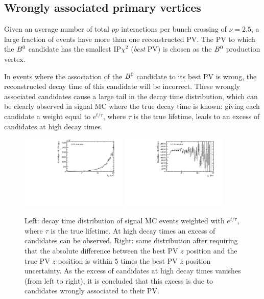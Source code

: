 \subsection{Wrongly associated primary vertices}
\label{sec:WrongPVs}

Given an average number of total $pp$ interactions per bunch crossing of
$\nu=\num{2.5}$, a large fraction of events have more than one reconstructed PV.
The PV to which the $B^0$ candidate has the smallest IP$\chi^2$ (\emph{best} PV) is chosen as the $B^0$ production vertex.

In events where the association of the $B^0$ candidate to its best PV
is wrong, the reconstructed decay time of this candidate will be incorrect. These wrongly
associated candidates cause a large tail in
the decay time distribution, which can be clearly observed in signal MC where the
true decay time is known: giving each candidate a weight equal to $e^{t/\tau}$, where $\tau$ is the
true lifetime, leads to an excess of candidates at high decay times.
%
\begin{figure}[t]
	\begin{center}
		\includegraphics[width=0.45\textwidth]{02Selection/figs/WrongPVs-weightedBad.pdf}
		\includegraphics[width=0.45\textwidth]{02Selection/figs/WrongPVs-weightedGoodMC.pdf}
	\end{center}
        \vspace{-2mm}
	\caption{Left: decay time distribution of signal MC events weighted with $e^{t/\tau}$, where $\tau$ is
	the true lifetime. At high decay times an excess of candidates can be
	observed. Right: same distribution after requiring that the
	absolute difference between the best PV $z$ position and the true PV $z$ position is within
	$5$ times the best PV $z$ position uncertainty. As the excess of candidates at high decay
	times vanishes (from left to right), it is concluded that this excess is due to candidates
	wrongly associated to their PV.}
	\label{fig:wrongPVs_MC}
\end{figure}
